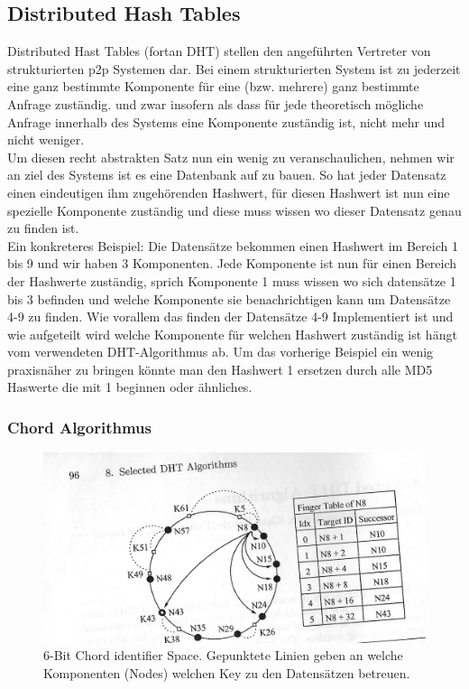 \documentclass[a4paper,12pt]{scrreprt}
\begin{document}
			\subsection{Distributed Hash Tables}
				
				Distributed Hast Tables (fortan DHT) stellen den angeführten Vertreter von strukturierten p2p Systemen dar. Bei einem strukturierten System ist zu jederzeit eine ganz bestimmte Komponente für eine (bzw. mehrere) ganz bestimmte Anfrage zuständig. und zwar insofern als dass für jede theoretisch mögliche Anfrage innerhalb des Systems eine Komponente zuständig ist, nicht mehr und nicht weniger. \\Um diesen recht abstrakten Satz nun ein wenig zu veranschaulichen, nehmen wir an ziel des Systems ist es eine Datenbank auf zu bauen. So hat jeder Datensatz einen eindeutigen ihm zugehörenden Hashwert, für diesen Hashwert ist nun eine spezielle Komponente zuständig und diese muss wissen wo dieser Datensatz genau zu finden ist. \\ Ein konkreteres Beispiel: Die Datensätze bekommen einen Hashwert im Bereich 1 bis 9 und wir haben 3 Komponenten. Jede Komponente ist nun für einen Bereich der Hashwerte zuständig, sprich Komponente 1 muss wissen wo sich datensätze 1 bis 3 befinden und welche Komponente sie benachrichtigen kann um Datensätze 4-9 zu finden. Wie vorallem das finden der Datensätze 4-9 Implementiert ist und wie aufgeteilt wird welche Komponente für welchen Hashwert zuständig ist hängt vom verwendeten DHT-Algorithmus ab. Um das vorherige Beispiel ein wenig praxisnäher zu bringen könnte man den Hashwert 1 ersetzen durch alle MD5 Haswerte die mit 1 beginnen oder ähnliches.
				\pagebreak
				\subsubsection{Chord Algorithmus}
					\begin{figure}[h]
						\centering
						\includegraphics[width=0.7\linewidth]{./graphics/Chord}
						\caption{6-Bit Chord identifier Space. Gepunktete Linien geben an welche Komponenten (Nodes) welchen Key zu den Datensätzen betreuen.}
						\label{fig:Chord}
					\end{figure}
\end{document}
